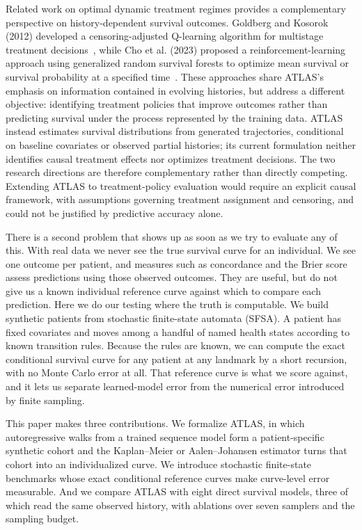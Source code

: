 Related work on optimal dynamic treatment regimes provides a complementary perspective on history-dependent survival outcomes. Goldberg and Kosorok (2012) developed a censoring-adjusted Q-learning algorithm for multistage treatment decisions~\citep{goldberg2012}, while Cho et al. (2023) proposed a reinforcement-learning approach using generalized random survival forests to optimize mean survival or survival probability at a specified time~\citep{cho2023survival}. These approaches share ATLAS's emphasis on information contained in evolving histories, but address a different objective: identifying treatment policies that improve outcomes rather than predicting survival under the process represented by the training data. ATLAS instead estimates survival distributions from generated trajectories, conditional on baseline covariates or observed partial histories; its current formulation neither identifies causal treatment effects nor optimizes treatment decisions. The two research directions are therefore complementary rather than directly competing. Extending ATLAS to treatment-policy evaluation would require an explicit causal framework, with assumptions governing treatment assignment and censoring, and could not be justified by predictive accuracy alone.

There is a second problem that shows up as soon as we try to evaluate any of this. With real data we never see the true survival curve for an individual. We see one outcome per patient, and measures such as concordance and the Brier score assess predictions using those observed outcomes. They are useful, but do not give us a known individual reference curve against which to compare each prediction. Here we do our testing where the truth is computable. We build synthetic patients from stochastic finite-state automata (SFSA). A patient has fixed covariates and moves among a handful of named health states according to known transition rules. Because the rules are known, we can compute the exact conditional survival curve for any patient at any landmark by a short recursion, with no Monte Carlo error at all. That reference curve is what we score against, and it lets us separate learned-model error from the numerical error introduced by finite sampling.

This paper makes three contributions. We formalize ATLAS, in which autoregressive walks from a trained sequence model form a patient-specific synthetic cohort and the Kaplan--Meier or Aalen--Johansen estimator turns that cohort into an individualized curve. We introduce stochastic finite-state benchmarks whose exact conditional reference curves make curve-level error measurable. And we compare ATLAS with eight direct survival models, three of which read the same observed history, with ablations over seven samplers and the sampling budget.

